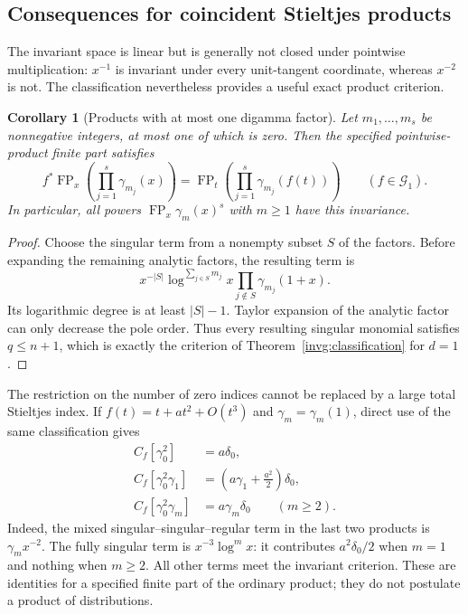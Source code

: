 \documentclass[11pt,a4paper]{article}
\newtheorem{corollary}[theorem]{Corollary}
\theoremstyle{definition}
\theoremstyle{remark}
\numberwithin{equation}{section}
\begin{document}
\subsection{Consequences for coincident Stieltjes products}

The invariant space is linear but is generally not closed under
pointwise multiplication: $x^{-1}$ is invariant under every unit-tangent
coordinate, whereas $x^{-2}$ is not.  The classification nevertheless
provides a useful exact product criterion.

\begin{corollary}[Products with at most one digamma factor]
\label{invg:stieltjes-products}
Let $m_1,\ldots,m_s$ be nonnegative integers, at most one of which is
zero.  Then the specified pointwise-product finite part satisfies
\begin{equation}\label{invg:stieltjes-products-formula}
 f^*\operatorname{FP}_x\!\left(\prod_{j=1}^{s}\gamma_{m_j}(x)\right)
 =\operatorname{FP}_t\!\left(\prod_{j=1}^{s}\gamma_{m_j}(f(t))\right)
 \qquad (f\in\mathscr G_1).
\end{equation}
In particular, all powers $\operatorname{FP}_x\gamma_m(x)^s$ with
$m\ge1$ have this invariance.
\end{corollary}
\begin{proof}
Choose the singular term from a nonempty subset $S$ of the factors.
Before expanding the remaining analytic factors, the resulting term is
\[
 x^{-|S|}\log^{\sum_{j\in S}m_j}x
             \prod_{j\notin S}\gamma_{m_j}(1+x).
\]
Its logarithmic degree is at least $|S|-1$.  Taylor expansion of the
analytic factor can only decrease the pole order.  Thus every resulting
singular monomial satisfies $q\le n+1$, which is exactly the criterion
of Theorem~\ref{invg:classification} for $d=1$.
\end{proof}

The restriction on the number of zero indices cannot be replaced by a
large total Stieltjes index.  If $f(t)=t+a t^2+O(t^3)$ and
$\gamma_m=\gamma_m(1)$, direct use of the same classification gives
\begin{align}
 C_f[\gamma_0^2]&=a\delta_0,\label{invg:product-counter1}\\
 C_f[\gamma_0^2\gamma_1]&=
             \left(a\gamma_1+\frac{a^2}{2}\right)\delta_0,
             \label{invg:product-counter2}\\
 C_f[\gamma_0^2\gamma_m]&=a\gamma_m\delta_0\qquad(m\ge2).
             \label{invg:product-counter3}
\end{align}
Indeed, the mixed singular--singular--regular term in the last two
products is $\gamma_m x^{-2}$.  The fully singular term is
$x^{-3}\log^m x$: it contributes $a^2\delta_0/2$ when $m=1$ and
nothing when $m\ge2$.  All other terms meet the invariant criterion.
These are identities for a specified finite part of the ordinary
product; they do not postulate a product of distributions.
\end{document}
